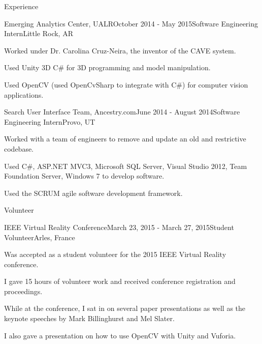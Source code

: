 \documentclass{resume} %
\begin{document}
\begin{rSection}{Experience}
\begin{rSubsection}{Emerging Analytics Center, UALR}{October 2014 - May 2015}{Software Engineering Intern}{Little Rock, AR}
	\item Worked under Dr. Carolina Cruz-Neira, the inventor of the CAVE system.
	\item Used Unity 3D C\# for 3D programming and model manipulation.
	\item Used OpenCV (used OpenCvSharp to integrate with C\#) for computer vision applications.
\end{rSubsection}

\begin{rSubsection}{Search User Interface Team, Ancestry.com}{June 2014 - August 2014}{Software Engineering Intern}{Provo, UT}
	\item Worked with a team of engineers to remove and update an old and restrictive codebase.
	\item Used C\#, ASP.NET MVC3, Microsoft SQL Server, Visual Studio 2012, Team Foundation Server, Windows 7 to develop software.
	\item Used the SCRUM agile software development framework.
\end{rSubsection}

\end{rSection}

\begin{rSection}{Volunteer}

\begin{rSubsection}{IEEE Virtual Reality Conference}{March 23, 2015 - March 27, 2015}{Student Volunteer}{Arles, France}
	\item Was accepted as a student volunteer for the 2015 IEEE Virtual Reality conference.
	\item I gave 15 hours of volunteer work and received conference registration and proceedings.
	\item While at the conference, I sat in on several paper presentations as well as the keynote speeches by Mark Billinghurst and Mel Slater.
	\item I also gave a presentation on how to use OpenCV with Unity and Vuforia.
\end{rSubsection}

\end{rSection}

\end{document}
